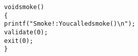 \begin{alltt}
void smoke()
\verb:{:
    printf("Smoke!: You called smoke()\verb:\n:");
    validate(0);
    exit(0);
\verb:}:
\end{alltt}
